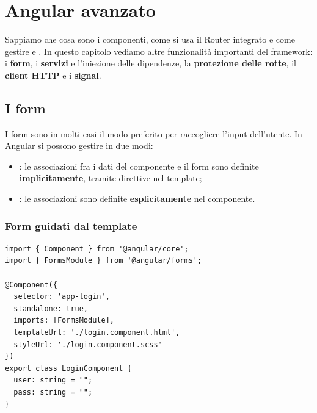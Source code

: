 \chapter{Angular avanzato}

Sappiamo che cosa sono i componenti, come si usa il Router integrato e come
gestire  e . In questo capitolo vediamo altre
funzionalità importanti del framework: i \textbf{form}, i \textbf{servizi} e
l'iniezione delle dipendenze, la \textbf{protezione delle rotte}, il
\textbf{client HTTP} e i \textbf{signal}.

\section{I form}

I form sono in molti casi il modo preferito per raccogliere l'input
dell'utente. In Angular si possono gestire in due modi:

\begin{itemize}
  \item {}: le associazioni fra i dati del
        componente e il form sono definite \textbf{implicitamente}, tramite
        direttive nel template;
  \item {}: le associazioni sono definite
        \textbf{esplicitamente} nel componente.
\end{itemize}

\subsection{Form guidati dal template}

\begin{lstlisting}[style=ts, name=login.component.ts]
import { Component } from '@angular/core';
import { FormsModule } from '@angular/forms';

@Component({
  selector: 'app-login',
  standalone: true,
  imports: [FormsModule],
  templateUrl: './login.component.html',
  styleUrl: './login.component.scss'
})
export class LoginComponent {
  user: string = "";
  pass: string = "";
}
\end{lstlisting}

